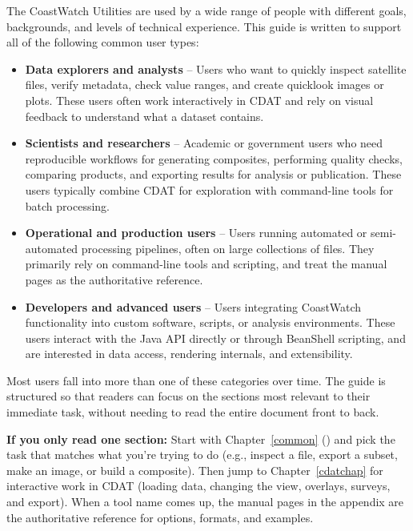 The CoastWatch Utilities are used by a wide range of people with different
goals, backgrounds, and levels of technical experience. This guide is written
to support all of the following common user types:
\begin{itemize}

  \item \textbf{Data explorers and analysts} -- Users who want to quickly
  inspect satellite files, verify metadata, check value ranges, and create
  quicklook images or plots. These users often work interactively in CDAT and
  rely on visual feedback to understand what a dataset contains.

  \item \textbf{Scientists and researchers} -- Academic or government users who
  need reproducible workflows for generating composites, performing quality
  checks, comparing products, and exporting results for analysis or
  publication. These users typically combine CDAT for exploration with
  command-line tools for batch processing.

  \item \textbf{Operational and production users} -- Users running automated or
  semi-automated processing pipelines, often on large collections of files.
  They primarily rely on command-line tools and scripting, and treat the
  manual pages as the authoritative reference.

  \item \textbf{Developers and advanced users} -- Users integrating CoastWatch
  functionality into custom software, scripts, or analysis environments. These
  users interact with the Java API directly or through BeanShell scripting,
  and are interested in data access, rendering internals, and extensibility.

\end{itemize}

Most users fall into more than one of these categories over time. The guide is
structured so that readers can focus on the sections most relevant to their
immediate task, without needing to read the entire document front to back.

\bigskip
\noindent\textbf{If you only read one section:} Start with Chapter~\ref*
{common} () and pick the task that matches what you’re trying
to do (e.g., inspect a file, export a subset, make an image, or build a
composite). Then jump to Chapter~\ref*{cdatchap} for interactive work in CDAT
(loading data, changing the view, overlays, surveys, and export). When a tool
name comes up, the manual pages in the appendix are the authoritative
reference for options, formats, and examples.

